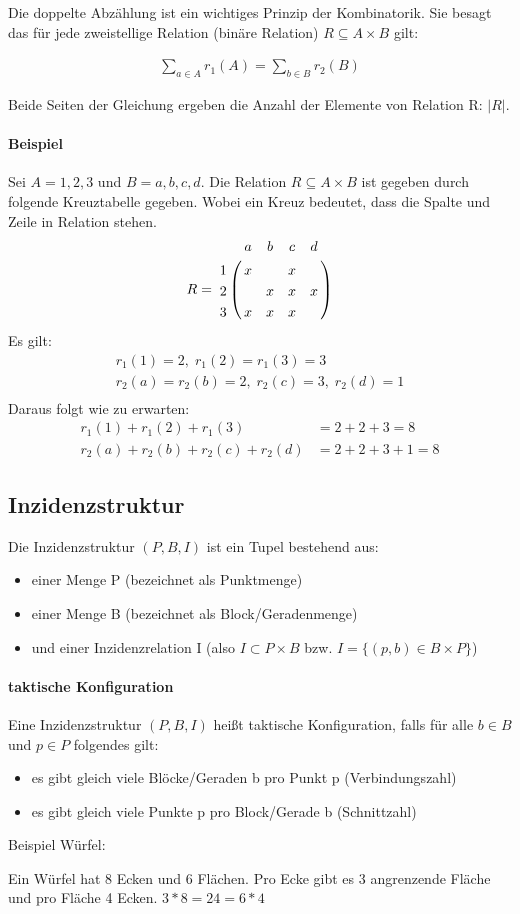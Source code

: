 Die doppelte Abzählung ist ein wichtiges Prinzip der Kombinatorik.
Sie besagt das für jede zweistellige Relation (binäre Relation) $R \subseteq A \times B$
gilt:

\begin{align}
  \sum_{a \in A} r_{1}(A) = \sum_{b \in B} r_{2}(B)
\end{align}

Beide Seiten der Gleichung ergeben die Anzahl der Elemente von Relation R: $|R|$.

\paragraph{Beispiel}
Sei $A = {1, 2, 3}$ und $B = {a, b, c, d}$. Die Relation $R \subseteq
A \times B$ ist gegeben durch folgende Kreuztabelle gegeben. Wobei ein
Kreuz bedeutet, dass die Spalte und Zeile in Relation stehen.
\begin{align*}
  R =
  \bordermatrix{
    & a & b & c & d \cr
   1& x &   & x &   \cr
   2&   & x & x & x \cr
   3& x & x & x &   \cr
  }
\end{align*}
Es gilt:
\begin{align*}
  r_{1}(1)=2,\; r_{1}(2)=r_{1}(3)=3\\
  r_{2}(a)=r_{2}(b)=2,\; r_{2}(c)=3,\; r_{2}(d)=1\\
\end{align*}
Daraus folgt wie zu erwarten:
\begin{align*}
  r_{1}(1) + r_{1}(2) + r_{1}(3) &= 2 + 2 + 3 = 8\\
  r_{2}(a) + r_{2}(b) + r_{2}(c) + r_{2}(d) &= 2 + 2 + 3 + 1 = 8
\end{align*}


\subsection{Inzidenzstruktur}
Die Inzidenzstruktur $(P,B,I)$ ist ein Tupel bestehend aus:
\begin{itemize}
\item einer Menge P (bezeichnet als Punktmenge)
\item einer Menge B (bezeichnet als Block/Geradenmenge)
\item und einer Inzidenzrelation I (also $I \subset P\times B$ bzw.
  $I = \{(p,b) \in B \times P\}$)
\end{itemize}

\paragraph{taktische Konfiguration}
Eine Inzidenzstruktur $(P,B,I)$ heißt taktische Konfiguration, falls
für alle $b\in B$ und $p \in P$ folgendes gilt:
\begin{itemize}
\item es gibt gleich viele Blöcke/Geraden b pro Punkt p (Verbindungszahl)
\item es gibt gleich viele Punkte p pro Block/Gerade b (Schnittzahl)
\end{itemize}

Beispiel Würfel:

Ein Würfel hat 8 Ecken und 6 Flächen. Pro Ecke gibt es 3 angrenzende
Fläche und pro Fläche 4 Ecken. $3 * 8 = 24 = 6 * 4$

